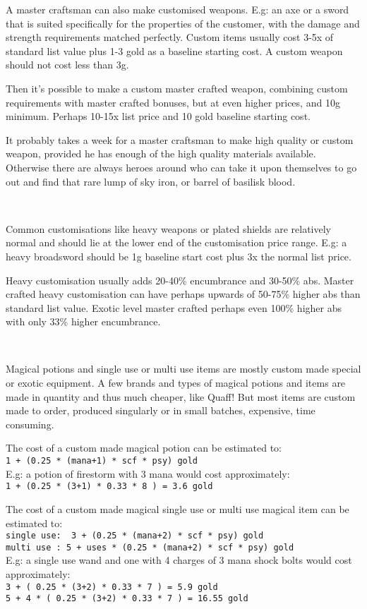 A master craftsman can also make customised weapons. E.g: an axe or a sword that is suited specifically for the properties of the customer, with the damage and strength requirements matched perfectly. Custom items usually cost 3-5x of standard list value plus 1-3 gold as a baseline starting cost. A custom weapon should not cost less than 3g.

Then it's possible to make a custom master crafted weapon, combining custom requirements with master crafted bonuses, but at even higher prices, and 10g minimum. Perhaps 10-15x list price and 10 gold baseline starting cost.

It probably takes a week for a master craftsman to make high quality or custom weapon, provided he has enough of the high quality materials available. Otherwise there are always heroes around who can take it upon themselves to go out and find that rare lump of sky iron, or barrel of basilisk blood.

\

Common customisations like heavy weapons or plated shields are relatively normal and should lie at the lower end of the customisation price range. E.g: a heavy broadsword should be 1g baseline start cost plus 3x the normal list price.

Heavy customisation usually adds 20-40\% encumbrance and 30-50\% abs. Master crafted heavy customisation can have perhaps upwards of 50-75\% higher abs than standard list value. Exotic level master crafted perhaps even 100\% higher abs with only 33\% higher encumbrance.

\

Magical potions and single use or multi use items are mostly custom made special or exotic equipment. A few brands and types of magical potions and items are made in quantity and thus much cheaper, like Quaff! But most items are custom made to order, produced singularly or in small batches, expensive, time consuming.

\noindent
The cost of a custom made magical potion can be estimated to:\\
\verb|1 + (0.25 * (mana+1) * scf * psy) gold| \\
E.g: a potion of firestorm with 3 mana would cost approximately:\\
\verb|1 + (0.25 * (3+1) * 0.33 * 8 ) = 3.6 gold|

\noindent
The cost of a custom made magical single use or multi use magical item can be estimated to: \\
\verb|single use:  3 + (0.25 * (mana+2) * scf * psy) gold| \\
\verb|multi use : 5 + uses * (0.25 * (mana+2) * scf * psy) gold| \\
E.g: a single use wand and one with 4 charges of 3 mana shock bolts would cost approximately: \\
\verb|3 + ( 0.25 * (3+2) * 0.33 * 7 ) = 5.9 gold| \\            %
\verb|5 + 4 * ( 0.25 * (3+2) * 0.33 * 7 ) = 16.55 gold|         %

